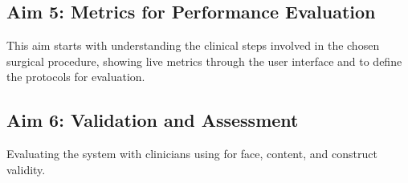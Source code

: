 \subsection{Aim 5: Metrics for Performance Evaluation}

This aim starts with understanding the clinical steps involved in the chosen surgical procedure, showing live metrics through the user interface and to define the protocols for evaluation.

\subsection{Aim 6: Validation and Assessment}

Evaluating the system with clinicians using for face, content, and construct validity.

